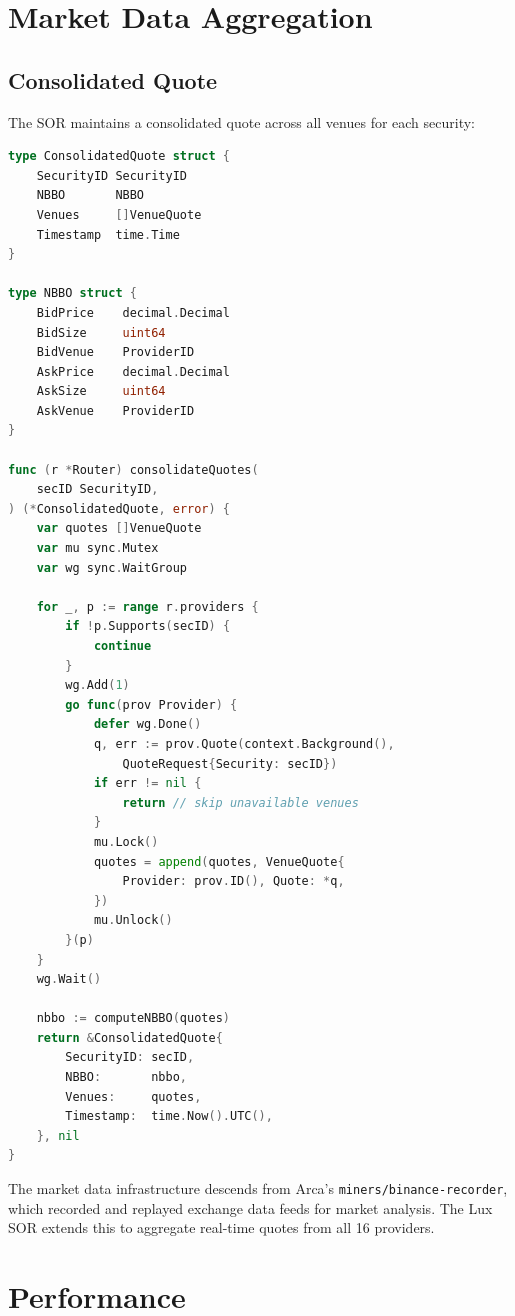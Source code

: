 \documentclass[11pt,a4paper]{article}
\begin{document}
\section{Market Data Aggregation}\label{sec:marketdata}

\subsection{Consolidated Quote}

The SOR maintains a consolidated quote across all venues for each security:

\begin{lstlisting}[language=Go,caption={Consolidated quote aggregation.}]
type ConsolidatedQuote struct {
    SecurityID SecurityID
    NBBO       NBBO
    Venues     []VenueQuote
    Timestamp  time.Time
}

type NBBO struct {
    BidPrice    decimal.Decimal
    BidSize     uint64
    BidVenue    ProviderID
    AskPrice    decimal.Decimal
    AskSize     uint64
    AskVenue    ProviderID
}

func (r *Router) consolidateQuotes(
    secID SecurityID,
) (*ConsolidatedQuote, error) {
    var quotes []VenueQuote
    var mu sync.Mutex
    var wg sync.WaitGroup

    for _, p := range r.providers {
        if !p.Supports(secID) {
            continue
        }
        wg.Add(1)
        go func(prov Provider) {
            defer wg.Done()
            q, err := prov.Quote(context.Background(),
                QuoteRequest{Security: secID})
            if err != nil {
                return // skip unavailable venues
            }
            mu.Lock()
            quotes = append(quotes, VenueQuote{
                Provider: prov.ID(), Quote: *q,
            })
            mu.Unlock()
        }(p)
    }
    wg.Wait()

    nbbo := computeNBBO(quotes)
    return &ConsolidatedQuote{
        SecurityID: secID,
        NBBO:       nbbo,
        Venues:     quotes,
        Timestamp:  time.Now().UTC(),
    }, nil
}
\end{lstlisting}

The market data infrastructure descends from Arca's \texttt{miners/binance-recorder}, which recorded and replayed exchange data feeds for market analysis. The Lux SOR extends this to aggregate real-time quotes from all 16 providers.

\section{Performance}\label{sec:performance}
\end{document}
